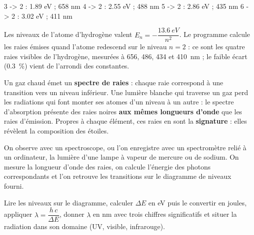 \begin{console}
3 -> 2 : 1.89 eV ; 658 nm
4 -> 2 : 2.55 eV ; 488 nm
5 -> 2 : 2.86 eV ; 435 nm
6 -> 2 : 3.02 eV ; 411 nm
\end{console}
\noindent{} Les niveaux de l'atome d'hydrogène valent $E_n=-\dfrac{\qty{13,6}{eV}}{n^2}$. Le programme calcule les raies émises quand l'atome
redescend sur le niveau $n=2$ : ce sont les quatre raies visibles de l'hydrogène, mesurées à 656, 486, 434 et \qty{410}{nm} ; le faible écart
(\qty{0,3}{\percent}) vient de l'arrondi des constantes.
\begin{propriete}
Un gaz chaud émet un \textbf{spectre de raies} : chaque raie correspond à une transition vers un niveau inférieur. Une lumière blanche qui
traverse un gaz perd les radiations qui font monter ses atomes d'un niveau à un autre : le spectre d'absorption présente des raies noires
\textbf{aux mêmes longueurs d'onde} que les raies d'émission. Propres à chaque élément, ces raies en sont la \textbf{signature} : elles révèlent
la composition des étoiles.
\end{propriete}
\begin{experience}
On observe avec un spectroscope, ou l'on enregistre avec un spectromètre relié à un ordinateur, la lumière d'une lampe à vapeur de
mercure ou de sodium. On mesure la longueur d'onde des raies, on calcule l'énergie des photons correspondants et l'on retrouve les
transitions sur le diagramme de niveaux fourni.
\end{experience}
\begin{rediger}
Lire les niveaux sur le diagramme, calculer $\Delta E$ en eV puis le convertir en joules, appliquer $\lambda=\dfrac{h\,c}{\Delta E}$, donner $\lambda$ en nm avec trois
chiffres significatifs et situer la radiation dans son domaine (UV, visible, infrarouge).
\end{rediger}
\exercices

